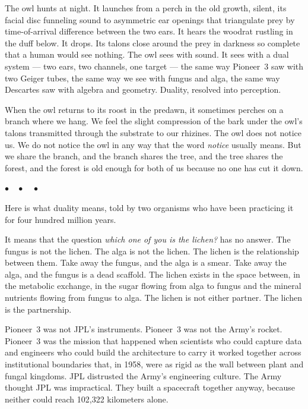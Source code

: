 \documentclass[12pt, letterpaper]{article}
\begin{document}
The owl hunts at night. It launches from a perch in the old growth, silent, its facial disc funneling sound to asymmetric ear openings that triangulate prey by time-of-arrival difference between the two ears. It hears the woodrat rustling in the duff below. It drops. Its talons close around the prey in darkness so complete that a human would see nothing. The owl sees with sound. It sees with a dual system --- two ears, two channels, one target --- the same way Pioneer~3 saw with two Geiger tubes, the same way we see with fungus and alga, the same way Descartes saw with algebra and geometry. Duality, resolved into perception.

When the owl returns to its roost in the predawn, it sometimes perches on a branch where we hang. We feel the slight compression of the bark under the owl's talons transmitted through the substrate to our rhizines. The owl does not notice us. We do not notice the owl in any way that the word \textit{notice} usually means. But we share the branch, and the branch shares the tree, and the tree shares the forest, and the forest is old enough for both of us because no one has cut it down.

\begin{center}
$\bullet\quad\bullet\quad\bullet$
\end{center}

Here is what duality means, told by two organisms who have been practicing it for four hundred million years.

It means that the question \textit{which one of you is the lichen?} has no answer. The fungus is not the lichen. The alga is not the lichen. The lichen is the relationship between them. Take away the fungus, and the alga is a smear. Take away the alga, and the fungus is a dead scaffold. The lichen exists in the space between, in the metabolic exchange, in the sugar flowing from alga to fungus and the mineral nutrients flowing from fungus to alga. The lichen is not either partner. The lichen is the partnership.

Pioneer~3 was not JPL's instruments. Pioneer~3 was not the Army's rocket. Pioneer~3 was the mission that happened when scientists who could capture data and engineers who could build the architecture to carry it worked together across institutional boundaries that, in 1958, were as rigid as the wall between plant and fungal kingdoms. JPL distrusted the Army's engineering culture. The Army thought JPL was impractical. They built a spacecraft together anyway, because neither could reach 102,322 kilometers alone.
\end{document}
